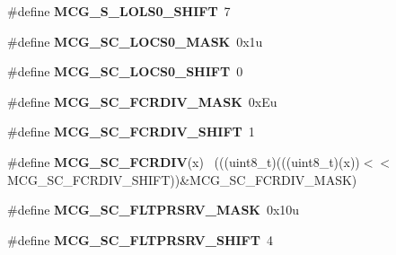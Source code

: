 \begin{DoxyCompactItemize}
\item 
\hypertarget{group___m_c_g___register___masks_ga5cddd795823b73d50830e628cee24644}{}\#define {\bfseries M\+C\+G\+\_\+\+S\+\_\+\+L\+O\+L\+S0\+\_\+\+S\+H\+I\+F\+T}~7\label{group___m_c_g___register___masks_ga5cddd795823b73d50830e628cee24644}

\item 
\hypertarget{group___m_c_g___register___masks_ga9a57acb821c7622eb2b25e6c7daf7e16}{}\#define {\bfseries M\+C\+G\+\_\+\+S\+C\+\_\+\+L\+O\+C\+S0\+\_\+\+M\+A\+S\+K}~0x1u\label{group___m_c_g___register___masks_ga9a57acb821c7622eb2b25e6c7daf7e16}

\item 
\hypertarget{group___m_c_g___register___masks_ga2a80b0f354602d5da8426e9d2b51ea12}{}\#define {\bfseries M\+C\+G\+\_\+\+S\+C\+\_\+\+L\+O\+C\+S0\+\_\+\+S\+H\+I\+F\+T}~0\label{group___m_c_g___register___masks_ga2a80b0f354602d5da8426e9d2b51ea12}

\item 
\hypertarget{group___m_c_g___register___masks_ga9b5d58f2f0a68eabe93f088dc2f81d2b}{}\#define {\bfseries M\+C\+G\+\_\+\+S\+C\+\_\+\+F\+C\+R\+D\+I\+V\+\_\+\+M\+A\+S\+K}~0x\+Eu\label{group___m_c_g___register___masks_ga9b5d58f2f0a68eabe93f088dc2f81d2b}

\item 
\hypertarget{group___m_c_g___register___masks_gacc99cc05a01e5807395bfe11518b26e3}{}\#define {\bfseries M\+C\+G\+\_\+\+S\+C\+\_\+\+F\+C\+R\+D\+I\+V\+\_\+\+S\+H\+I\+F\+T}~1\label{group___m_c_g___register___masks_gacc99cc05a01e5807395bfe11518b26e3}

\item 
\hypertarget{group___m_c_g___register___masks_gad48d91070247c5d3fab173623ed5ac3d}{}\#define {\bfseries M\+C\+G\+\_\+\+S\+C\+\_\+\+F\+C\+R\+D\+I\+V}(x)                                              ~(((uint8\+\_\+t)(((uint8\+\_\+t)(x))$<$$<$M\+C\+G\+\_\+\+S\+C\+\_\+\+F\+C\+R\+D\+I\+V\+\_\+\+S\+H\+I\+F\+T))\&M\+C\+G\+\_\+\+S\+C\+\_\+\+F\+C\+R\+D\+I\+V\+\_\+\+M\+A\+S\+K)\label{group___m_c_g___register___masks_gad48d91070247c5d3fab173623ed5ac3d}

\item 
\hypertarget{group___m_c_g___register___masks_ga1eea80f4646116c2ca2a68aa3469436a}{}\#define {\bfseries M\+C\+G\+\_\+\+S\+C\+\_\+\+F\+L\+T\+P\+R\+S\+R\+V\+\_\+\+M\+A\+S\+K}~0x10u\label{group___m_c_g___register___masks_ga1eea80f4646116c2ca2a68aa3469436a}

\item 
\hypertarget{group___m_c_g___register___masks_gac75a3cb915913ba4acc64a098bba4eb5}{}\#define {\bfseries M\+C\+G\+\_\+\+S\+C\+\_\+\+F\+L\+T\+P\+R\+S\+R\+V\+\_\+\+S\+H\+I\+F\+T}~4\label{group___m_c_g___register___masks_gac75a3cb915913ba4acc64a098bba4eb5}


\end{DoxyCompactItemize}
